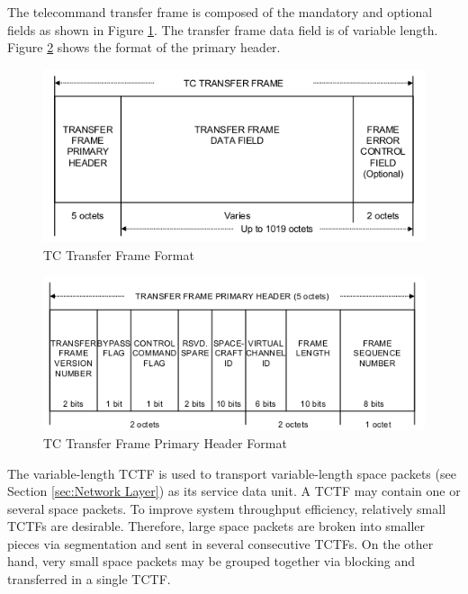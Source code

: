 The telecommand transfer frame is composed of the mandatory and optional fields as shown in Figure \ref{fig:TC Transfer Frame Format}. The transfer frame data field is of variable length. Figure \ref{fig:TC Transfer Frame Primary Header Format} shows the format of the primary header.

\begin{figure}[h]
\centering\includegraphics[scale=0.6]{fig/tc_transfer_frame_format}
\caption{TC Transfer Frame Format}
\label{fig:TC Transfer Frame Format}
\end{figure}

\begin{figure}[h]
\centering\includegraphics[scale=0.6]{fig/tc_transfer_frame_primary_header_format}
\caption{TC Transfer Frame Primary Header Format}
\label{fig:TC Transfer Frame Primary Header Format}
\end{figure}

The variable-length TCTF is used to transport variable-length space packets (see Section \ref{sec:Network Layer}) as its service data unit. A TCTF may contain one or several space packets. To improve system throughput efficiency, relatively small TCTFs are desirable. Therefore, large space packets are broken into smaller pieces via segmentation and sent in several consecutive TCTFs. On the other hand, very small space packets may be grouped together via blocking and transferred in a single TCTF.

